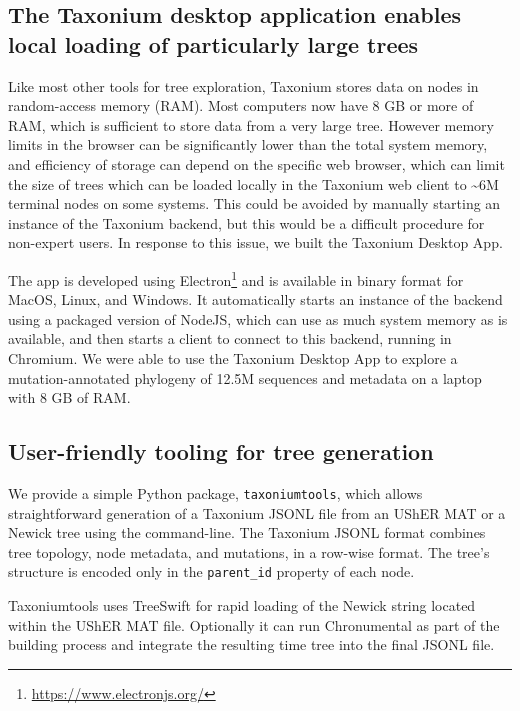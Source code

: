 \documentclass[twocolumn]{bioRxiv}
\begin{document}
\subsection*{The Taxonium desktop application enables local loading of particularly large trees}

Like most other tools for tree exploration, Taxonium stores data on nodes in random-access memory (RAM). Most computers now have 8 GB or more of RAM, which is sufficient to store data from a very large tree. However memory limits in the browser can be significantly lower than the total system memory, and efficiency of storage can depend on the specific web browser, which can limit the size of trees which can be loaded locally in the Taxonium web client to \textasciitilde{}6M terminal nodes on some systems. This could be avoided by manually starting an instance of the Taxonium backend, but this would be a difficult procedure for non-expert users. In response to this issue, we built the Taxonium Desktop App.

The app is developed using Electron\footnote{\url{https://www.electronjs.org/}} and is available in binary format for MacOS, Linux, and Windows. It automatically starts an instance of the backend using a packaged version of NodeJS, 
which can use as much system memory as is available, and then starts a client to connect to this backend, running in Chromium. We were able to use the Taxonium Desktop App to explore a mutation-annotated phylogeny of 12.5M sequences and metadata on a laptop with 8 GB of RAM.



\subsection*{User-friendly tooling for tree generation}

We provide a simple Python package, \texttt{taxoniumtools}, which allows straightforward generation of a Taxonium JSONL file from an UShER MAT or a Newick tree using the command-line. The Taxonium JSONL format combines tree topology, node metadata, and mutations, in a row-wise format. The tree's structure is encoded only in the \texttt{parent\_id} property of each node.

Taxoniumtools uses TreeSwift \citep{moshiri2020treeswift} for rapid loading of the Newick string located within the UShER MAT file. Optionally it can run Chronumental \citep{chronumental} as part of the building process and integrate the resulting time tree into the final JSONL file.
\end{document}
